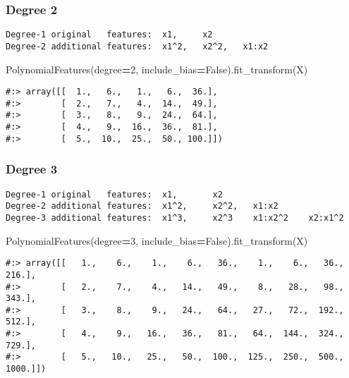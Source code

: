 \documentclass[
]{book}
\newenvironment{Shaded}{\begin{snugshade}}{\end{snugshade}}
\newcommand{\DecValTok}[1]{\textcolor[rgb]{0.06,0.06,0.06}{#1}}
\newcommand{\NormalTok}[1]{#1}
\newcommand{\OperatorTok}[1]{\textcolor[rgb]{0.43,0.43,0.43}{\textbf{#1}}}
\newcommand{\VariableTok}[1]{\textcolor[rgb]{0,0,0}{#1}}
\begin{document}
\hypertarget{degree-2-1}{%
\subsubsection{Degree 2}\label{degree-2-1}}

\begin{verbatim}
Degree-1 original   features:  x1,     x2  
Degree-2 additional features:  x1^2,   x2^2,   x1:x2 
\end{verbatim}

\begin{Shaded}
\begin{Highlighting}[]
\NormalTok{PolynomialFeatures(degree}\OperatorTok{=}\DecValTok{2}\NormalTok{, include\_bias}\OperatorTok{=}\VariableTok{False}\NormalTok{).fit\_transform(X)}
\end{Highlighting}
\end{Shaded}

\begin{verbatim}
#:> array([[  1.,   6.,   1.,   6.,  36.],
#:>        [  2.,   7.,   4.,  14.,  49.],
#:>        [  3.,   8.,   9.,  24.,  64.],
#:>        [  4.,   9.,  16.,  36.,  81.],
#:>        [  5.,  10.,  25.,  50., 100.]])
\end{verbatim}

\hypertarget{degree-3-1}{%
\subsubsection{Degree 3}\label{degree-3-1}}

\begin{verbatim}
Degree-1 original   features:  x1,       x2  
Degree-2 additional features:  x1^2,     x2^2,   x1:x2 
Degree-3 additional features:  x1^3,     x2^3    x1:x2^2    x2:x1^2
\end{verbatim}

\begin{Shaded}
\begin{Highlighting}[]
\NormalTok{PolynomialFeatures(degree}\OperatorTok{=}\DecValTok{3}\NormalTok{, include\_bias}\OperatorTok{=}\VariableTok{False}\NormalTok{).fit\_transform(X)}
\end{Highlighting}
\end{Shaded}

\begin{verbatim}
#:> array([[   1.,    6.,    1.,    6.,   36.,    1.,    6.,   36.,  216.],
#:>        [   2.,    7.,    4.,   14.,   49.,    8.,   28.,   98.,  343.],
#:>        [   3.,    8.,    9.,   24.,   64.,   27.,   72.,  192.,  512.],
#:>        [   4.,    9.,   16.,   36.,   81.,   64.,  144.,  324.,  729.],
#:>        [   5.,   10.,   25.,   50.,  100.,  125.,  250.,  500., 1000.]])
\end{verbatim}
\end{document}
